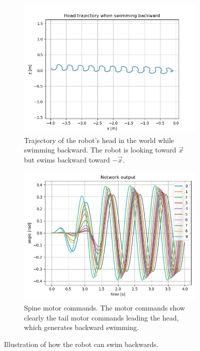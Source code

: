 \documentclass{cmc}
\begin{document}
\begin{figure}[!ht]
  \begin{subfigure}[b]{0.48\textwidth}
    \includegraphics[width=\textwidth]{figures/9d/backward_trajectory.jpg}
    \caption{Trajectory of the robot's head in the world while swimming backward. The robot is looking toward $\Vec{x}$ but swims backward toward $-\Vec{x}$.}
    \label{fig:9d_back_traj}
  \end{subfigure}
  \begin{subfigure}[b]{0.48\textwidth}
    \includegraphics[width=\textwidth]{figures/9d/backward_spine_angles.jpg}
    \caption{Spine motor commands. The motor commands show clearly the tail motor commands leading the head, which generates backward swimming.}
    \label{fig:9d_back_angles}
  \end{subfigure}
  \caption{Illustration of how the robot can swim backwards.}
  \label{fig:9d_backward}
\end{figure}
\end{document}
